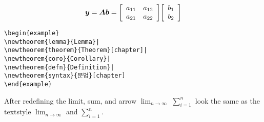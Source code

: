\documentclass[11pt]{article}
\newcommand{\dsum}[2]{{\displaystyle \sum_{#1}^{#2}}}
\newcommand{\go}{\longrightarrow}
\newcommand{\dlim}[1]{{\displaystyle \lim_{#1}}}
\newenvironment{barray}[1]{\left[\begin{array}{#1}}{\end{array}\right]}
\renewcommand{\dsum}[2]{\sum_{#1}^{#2}}
\renewcommand{\dlim}[1]{\lim_{#1}}
\renewcommand{\go}{\rightarrow}
\renewcommand{\dlim}[1]{{\displaystyle \lim_{#1}}}
\renewcommand{\dsum}[2]{{\displaystyle \sum_{#1}^{#2}}}
\begin{document}
$$\mbox{{\boldmath $y$}}=\mbox{{\boldmath $Ab$}} = \begin{barray}{cc} a_{11} & a_{12} \\ a_{21} & a_{22} \end{barray}
\begin{barray}{c} b_1 \\ b_2 \\ \end{barray}$$

\newenvironment{example}
{\vspace*{.6\baselineskip}\hrule\nopagebreak[4]
\begin{list}{}
{\setlength{\rightmargin}{.2in}}
\refstepcounter{excntr}
\item[예 \thechapter.\arabic{excntr}]}
{\vspace*{.6\baselineskip}\hrule\end{list}}

\begin{verbatim}
\begin{example}
\newtheorem{lemma}{Lemma}|
\newtheorem{theorem}{Theorem}[chapter]|
\newtheorem{coro}{Corollary}|
\newtheorem{defn}{Definition}|
\newtheorem{syntax}{문법}[chapter]
\end{example}
\end{verbatim}

After redefining the limit, sum, and arrow $\dlim{n\go\infty}$ $\dsum{i=1}{n}$ look the same as the textstyle $\lim_{n\go\infty}$ and $\sum_{i=1}^n$.
\end{document}

